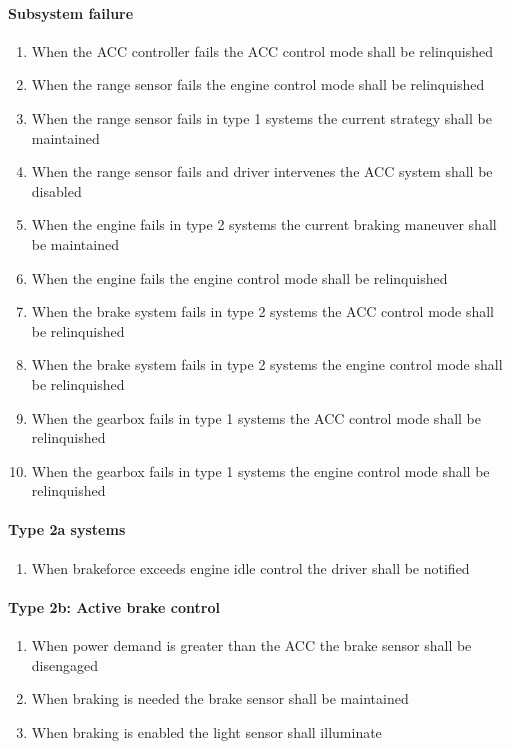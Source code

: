\paragraph{Subsystem failure}
\begin{enumerate}
    \item{When the ACC controller fails the ACC control mode shall be relinquished}
    \item{When the range sensor fails the engine control mode shall be relinquished}
    \item{When the range sensor fails in type 1 systems the current strategy shall be maintained}
    \item{When the range sensor fails and driver intervenes the ACC system shall be disabled}
    \item{When the engine fails in type 2 systems the current braking maneuver shall be maintained}
    \item{When the engine fails the engine control mode shall be relinquished}
    \item{When the brake system fails in type 2 systems the ACC control mode shall be relinquished}
    \item{When the brake system fails in type 2 systems the engine control mode shall be relinquished}
    \item{When the gearbox fails in type 1 systems the ACC control mode shall be relinquished}
    \item{When the gearbox fails in type 1 systems the engine control mode shall be relinquished}
\end{enumerate}

\paragraph{Type 2a systems}
\begin{enumerate}
    \item{When brakeforce exceeds engine idle control the driver shall be notified}
\end{enumerate}

\paragraph{Type 2b: Active brake control}
\begin{enumerate}
    \item{When power demand is greater than the ACC the brake sensor shall be disengaged}
    \item{When braking is needed the brake sensor shall be maintained}
    \item{When braking is enabled the light sensor shall illuminate}
\end{enumerate}

